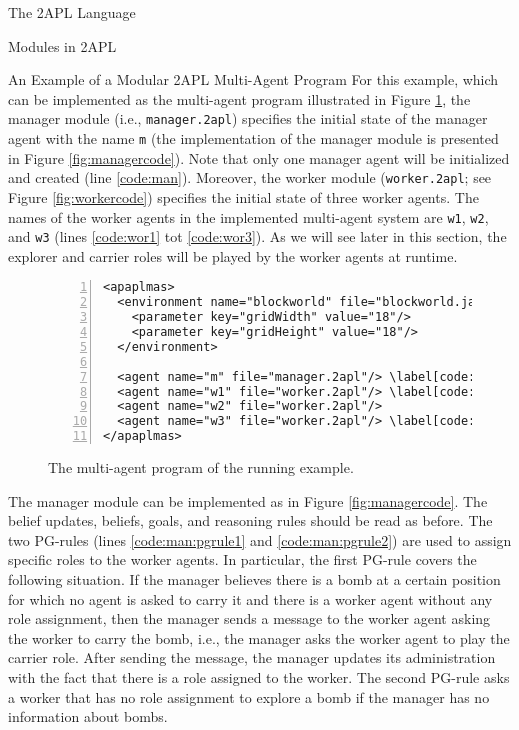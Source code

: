 \begin{chapter}{The 2APL Language}
\begin{section}{Modules in 2APL}
\begin{subsection}{An Example of a Modular 2APL Multi-Agent Program}
For this example, which can be implemented as the multi-agent
program illustrated in Figure \ref{fig:mas}, the manager module
(i.e., \texttt{manager.2apl}) specifies the initial state of the
manager agent with the name \texttt{m} (the implementation of the
manager module is presented in Figure \ref{fig:managercode}). Note
that only one manager agent will be initialized and created (line
\ref{code:man}). Moreover, the worker module (\texttt{worker.2apl};
see Figure \ref{fig:workercode}) specifies the initial state of
three worker agents. The names of the worker agents in the
implemented multi-agent system are \texttt{w1}, \texttt{w2}, and
\texttt{w3} (lines \ref{code:wor1} tot \ref{code:wor3}). As we will
see later in this section, the explorer and carrier roles will be
played by the worker agents at runtime.

\begin{figure}[H]
\begin{Verbatim}[frame=single,numbers=left,numbersep=2pt,commandchars=\\\[\]]
<apaplmas>
  <environment name="blockworld" file="blockworld.jar">
    <parameter key="gridWidth" value="18"/>
    <parameter key="gridHeight" value="18"/>
  </environment>

  <agent name="m" file="manager.2apl"/> \label[code:man]
  <agent name="w1" file="worker.2apl"/> \label[code:wor1]
  <agent name="w2" file="worker.2apl"/>
  <agent name="w3" file="worker.2apl"/> \label[code:wor3]
</apaplmas>
\end{Verbatim}
\caption{The multi-agent program of the running
example.}\label{fig:mas}
\end{figure}

The manager module can be implemented as in Figure
\ref{fig:managercode}. The belief updates, beliefs, goals, and
reasoning rules should be read as before. The two PG-rules (lines
\ref{code:man:pgrule1} and \ref{code:man:pgrule2}) are
used to assign specific roles to the worker agents. In particular,
the first PG-rule covers the following situation. If the manager
believes there is a bomb at a certain position for which no agent is
asked to carry it and there is a worker agent without any role
assignment, then the manager sends a message to the worker agent
asking the worker to carry the bomb, i.e., the manager asks the
worker agent to play the carrier role. After sending the message,
the manager updates its administration with the fact that there is a
role assigned to the worker. The second PG-rule asks a worker that
has no role assignment to explore a bomb if the manager has no
information about bombs.


\end{subsection}
\end{section}
\end{chapter}
